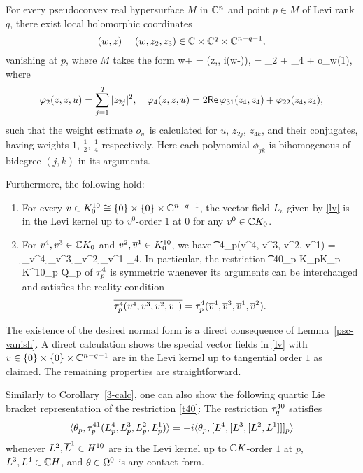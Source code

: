 \documentclass[12pt]{amsart}
\begin{document}
\bp{}
For every pseudoconvex real hypersurface $M$ in ${\mathbb{C}}^{n}$ 
and point $p\in M$ of Levi rank $q$, 
there exist local holomorphic coordinates 
$$
	(w,z)=(w,z_2, z_3)\in {\mathbb{C}}\times {\mathbb{C}}^q\times {\mathbb{C}}^{n-q-1},
$$ 
vanishing at $p$,
where $M$ takes the form
\beq{}
	w+ \w = \phi(z,\z , i(w-\w)), 
	\quad
	\phi = \phi_2 + \phi_4 + o_w(1), 
\eeq
where
$$
	\varphi_2(z,{\bar z},u) = \sum_{j=1}^q |z_{2j}|^2,
	\quad
	\varphi_4(z,{\bar z},u) = 2{\sf Re}\, \varphi_{31}(z_4,{\bar z}_4) + \varphi_{22}(z_4,{\bar z}_4),
$$
such that the weight estimate $o_w$ is calculated for $u$, $z_{2j}$, $z_{4k}$, and their conjugates, 
having weights 
$1$, $\frac12$, $\frac14$ respectively.
Here each polynomial $\phi_{jk}$ is bihomogenous of bidegree $(j,k)$ in its arguments.

Furthermore, the following hold:
\begin{enumerate}
\item
For every 
$v\in K^{10}_0\cong \{0\} \times \{0\} \times {\mathbb{C}}^{n-q-1}$, 
the vector field $L_v$ given by \eqref{lv} is 
in the Levi kernel up to $v^0$-order $1$ at $0$
for any $v^0\in {\mathbb{C}} K_0$.
\item
For $v^4, v^3\in {\mathbb{C}} K_0$
and
$v^2, \overline{v}^1\in K^{10}_0$,
we have
\beq{}
	\t^4_p(v^4, v^3, v^2, v^1) 
	= \d_{v^4} \d_{v^3} \d_{v^2} \d_{v^1} \phi_4.
\eeq
%
In particular, the restriction
\beq{}
	\t^{40}_p \colon \C K_p\times  \C K_p \times K^{10}_p\times {} \to \C Q_p
\eeq 
of $\tau^4_p$ is symmetric whenever its arguments can be interchanged
and satisfies the reality condition
$$
	\overline{\tau^4_p(v^4, v^3, v^2, v^1)}
	=
	\tau^4_p(\overline{v}^4, \overline{v}^3, \overline{v}^1, \overline{v}^2).
$$
\end{enumerate}
\ep

\bpf
The existence of the desired normal form 
is a direct consequence of Lemma~\ref{psc-vanish}.
A direct calculation shows the special vector fields in \eqref{lv}
with $v\in \{0\} \times \{0\} \times {\mathbb{C}}^{n-q-1}$ are in the Levi kernel up to tangential order $1$
as claimed.
The remaining properties are straightforward. 
\epf


Similarly to Corollary~\ref{3-calc},
one can also show the following quartic Lie bracket
representation of the restriction 
\eqref{t40}:
\bl
The restriction $\tau^{40}_q$
satisfies
$$
	\langle \theta_p, \tau^{41}_p(L^4_p, L^3_p, L^2_p, L^1_p)\rangle 
	= -i\langle \theta_p, [L^4, [L^3, [L^2, L^1]]]_p\rangle
$$
whenever $L^2, \overline{L}^1\in H^{10}$ are in the Levi kernel
up to ${\mathbb{C}} K$-order $1$ at $p$, $L^3, L^4\in {\mathbb{C}} H$,
and $\theta\in \Omega^0$ is any contact form.
\el
\end{document}
